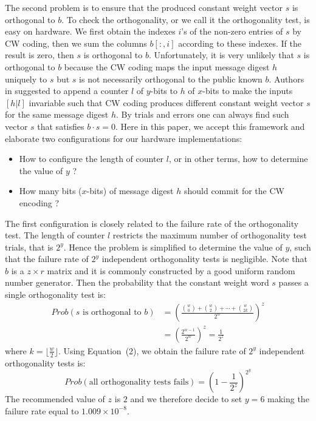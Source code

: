 \documentclass[10pt,journal,compsoc]{IEEEtran}
\begin{document}
The second problem is to ensure that the produced constant weight vector $s$ is orthogonal to $b$.
To check the orthogonality, or we call it the orthogonality test, is easy on hardware.  We first obtain the indexes $i$'s of the non-zero entries of $s$ by CW coding, then we sum the columns $b[:,i]$ according to these indexes. If the result is zero, then $s$ is orthogonal to $b$. Unfortunately, it is very unlikely that $s$ is orthogonal to $b$ because the CW coding maps the input message digest $h$ uniquely to $s$ but $s$ is not necessarily orthogonal to the public known $b$. Authors in \cite{baldi2013using} suggested to append a counter $l$ of $y$-bits to $h$ of $x$-bits to make the inputs $[h|l]$ invariable such that CW coding produces different constant weight vector $s$ for the same message digest $h$. By trials and errors one can always find such vector $s$ that satisfies $b\cdot s = 0$. Here in this paper, we accept this framework and elaborate two configurations for our hardware implementations:
\begin{itemize}
\item How to configure the length of counter $l$, or in other terms, how to determine the value of $y$ ?
\item How many bits ($x$-bits) of message digest $h$ should commit for the CW encoding ?
\end{itemize}
The first configuration is closely related to the failure rate of the orthogonality test.
The length of counter $l$ restricts the maximum number of orthogonality test trials, that is $2^y$. Hence the problem is
simplified to determine the value of $y$, such that the failure rate of $2^y$ independent orthogonality tests is negligible.
Note that $b$ is a $z\times r$ matrix and it is commonly constructed by a good uniform random number generator. Then the probability that the constant weight word $s$ passes a single orthogonality test is:
\begin{equation}
\begin{split}
Prob(s \text{ is orthogonal to } b) &= \left(\frac{\binom{w}{0}+\binom{w}{2}+\cdots+\binom{w}{2k}}{2^w}\right)^{z} \\
                                    &= (\frac{2^{w-1}}{2^w})^z = \frac{1}{2^z}
\end{split}
\end{equation} where $k=\lfloor \frac{w}{2}\rfloor$.
Using Equation~(2), we obtain the failure rate of $2^y$ independent orthogonality tests is:
\begin{equation}
Prob(\text{all orthogonality tests fails}) = (1-\frac{1}{2^z})^{2^y}
\end{equation}
The recommended value of $z$ is $2$ and we therefore decide to set $y=6$ making the failure rate equal to $1.009\times 10^{-8}$.
\end{document}

